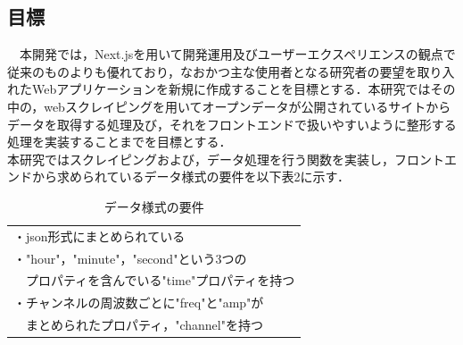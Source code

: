 \subsection{目標}
　本開発では，Next.jsを用いて開発運用及びユーザーエクスペリエンスの観点で従来のものよりも優れており，なおかつ主な使用者となる研究者の要望を取り入れたWebアプリケーションを新規に作成することを目標とする．本研究ではその中の，webスクレイピングを用いてオープンデータが公開されているサイトからデータを取得する処理及び，それをフロントエンドで扱いやすいように整形する処理を実装することまでを目標とする．\\
 本研究ではスクレイピングおよび，データ処理を行う関数を実装し，フロントエンドから求められているデータ様式の要件を以下表2に示す． \\
 \begin{table}[h]
  \centering
  \caption{データ様式の要件}
  \begin{tabular}{l}
  \toprule
     ・json形式にまとめられている\\
     ・"hour"，"minute"，"second"という3つの\\
     　プロパティを含んでいる"time"プロパティを持つ\\
     ・チャンネルの周波数ごとに"freq"と"amp"が\\
     　まとめられたプロパティ，"channel"を持つ\\
  \end{tabular}
\end{table}
